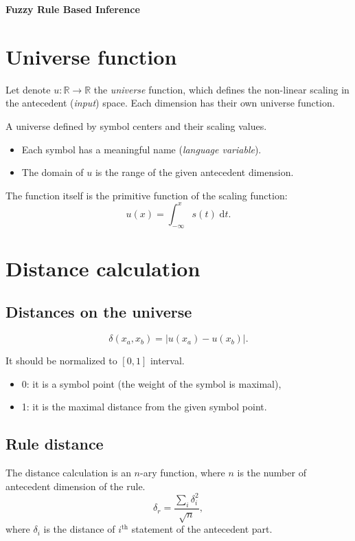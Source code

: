 \documentclass[a4paper,12pt]{article}
\begin{document}
\begin{center}
    \Large \textbf{Fuzzy Rule Based Inference}
\end{center}

\section{Universe function}

Let denote $u: \mathbb{R} \rightarrow \mathbb{R}$ the \textit{universe} function, which defines the non-linear scaling in the antecedent (\textit{input}) space.
Each dimension has their own universe function.

A universe defined by symbol centers and their scaling values.
\begin{itemize}
    \item Each symbol has a meaningful name (\textit{language variable}).
    \item The domain of $u$ is the range of the given antecedent dimension.
\end{itemize}

The function itself is the primitive function of the scaling function:
\[
u(x) = \int_{-\infty}^{x} \! s(t) \; \mathrm{d}t.
\]

\section{Distance calculation}

\subsection{Distances on the universe}

\[
\delta(x_a, x_b) = |u(x_a) - u(x_b)|.
\]

It should be normalized to $[0, 1]$ interval.
\begin{itemize}
    \item 0: it is a symbol point (the weight of the symbol is maximal),
    \item 1: it is the maximal distance from the given symbol point.
\end{itemize}

\subsection{Rule distance}

The distance calculation is an $n$-ary function, where $n$ is the number of antecedent dimension of the rule.
\[
\delta_r = \dfrac{\sum_i \delta_i^2}{\sqrt{n}},
\]
where $\delta_i$ is the distance of $i^{\text{th}}$ statement of the antecedent part.
\end{document}
